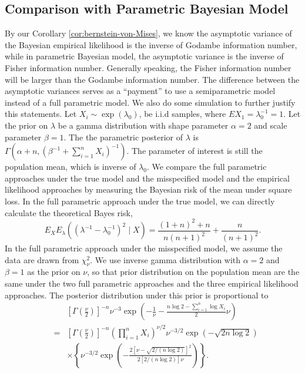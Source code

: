 {\subsection{Comparison with Parametric Bayesian Model}
By our Corollary \ref{cor:bernstein-von-Mises}, 
we know the asymptotic variance of the Bayesian empirical likelihood is the inverse of Godambe information number,
 while in parametric Bayesian model,
 the asymptotic variance is the inverse of Fisher information number. 
Generally speaking, the Fisher information number will be larger than the Godambe information number. 
The difference between the asymptotic variances serves as a ``payment'' to use a semiparametric model instead of a full parametric model. 
We also do some simulation to further justify this statements.
Let $X_i \sim \exp\left(\lambda_0\right)$, be i.i.d samples,
 where $ EX_1=\lambda_0^{-1}=1$. 
 Let the prior on $\lambda$ be a gamma distribution with shape parameter $\alpha=2$ and scale parameter $\beta=1$.
 The the parametric posterior of $\lambda$ is $\Gamma \left(\alpha +n, \left( \beta^{-1}+\sum_{i=1}^n X_i \right)^{-1}\right)$. 
 The parameter of interest is still the population mean, which is inverse of $\lambda_0$. 
 We compare the full parametric approaches under the true model and the misspecified model and the empirical likelihood approaches by measuring the Bayesian risk of the mean under square loss.
 In the full parametric approach under the true model, we can directly calculate the theoretical Bayes risk,
  \[  E_{X}E_\lambda \left(\left(\lambda^{-1}-\lambda_{0}^{-1}\right)^{2}\mid X\right)=  \frac{\left(1+n\right)^{2}+n}{n\left(n+1\right)^{2}}+\frac{n}{\left(n+1\right)^{2}}.  \] 
 In the full parametric approach under the misspecified model,
 we assume the data are drawn from $\chi^2_\nu$.
 We use inverse gamma distribution with $\alpha=2$ and $\beta=1$ as the prior on $\nu$,
 so that prior distribution on the population mean are the same under the two full parametric approaches and the three empirical likelihood approaches.
 The posterior distribution under this prior is proportional to 
 		\begin{eqnarray*}	& &\left[\Gamma\left(\frac{\nu}{2}\right)\right]^{-n}\nu^{-3}\exp\left(-\frac{1}{\nu}-\frac{n\log2-\sum_{i=1}^{n}\log X_{i}}{2}\nu\right)\\ 	&=&	\left[\Gamma\left(\frac{\nu}{2}\right)\right]^{-n}\left(\prod_{i=1}^{n} X_{i}\right)^{\nu/2}\nu^{-3/2}\exp\left(-\sqrt{2 n\log2}\right)\\ 		&& \times \left\{ \nu^{-3/2}\exp\left(-\frac{2\left[\nu-\sqrt{2/\left(n\log2\right)}\right]^{2}}{2\left[2/\left(n\log2\right)\right]\nu}\right)\right\} . 		\end{eqnarray*}
}
